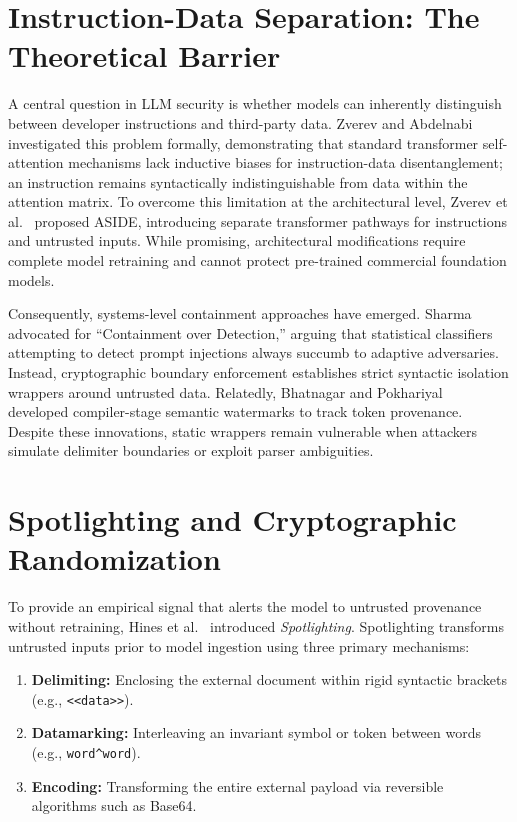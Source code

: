 \section{Instruction-Data Separation: The Theoretical Barrier}
\label{sec:rel_instruction_data_sep}

A central question in LLM security is whether models can inherently distinguish between developer instructions and third-party data. Zverev and Abdelnabi~\cite{zverev2025can} investigated this problem formally, demonstrating that standard transformer self-attention mechanisms lack inductive biases for instruction-data disentanglement; an instruction remains syntactically indistinguishable from data within the attention matrix. To overcome this limitation at the architectural level, Zverev et al.~\cite{zverev2026aside} proposed ASIDE, introducing separate transformer pathways for instructions and untrusted inputs. While promising, architectural modifications require complete model retraining and cannot protect pre-trained commercial foundation models.

Consequently, systems-level containment approaches have emerged. Sharma~\cite{sharma2026containment} advocated for ``Containment over Detection,'' arguing that statistical classifiers attempting to detect prompt injections always succumb to adaptive adversaries. Instead, cryptographic boundary enforcement establishes strict syntactic isolation wrappers around untrusted data. Relatedly, Bhatnagar and Pokhariyal~\cite{bhatnagar2025semantically} developed compiler-stage semantic watermarks to track token provenance. Despite these innovations, static wrappers remain vulnerable when attackers simulate delimiter boundaries or exploit parser ambiguities.

\section{Spotlighting and Cryptographic Randomization}
\label{sec:rel_spotlighting}

To provide an empirical signal that alerts the model to untrusted provenance without retraining, Hines et al.~\cite{hines2024spotlighting} introduced \emph{Spotlighting}. Spotlighting transforms untrusted inputs prior to model ingestion using three primary mechanisms:
\begin{enumerate}
    \item \textbf{Delimiting:} Enclosing the external document within rigid syntactic brackets (e.g., \texttt{<<data>>}).
    \item \textbf{Datamarking:} Interleaving an invariant symbol or token between words (e.g., \texttt{word\^{}word}).
    \item \textbf{Encoding:} Transforming the entire external payload via reversible algorithms such as Base64.
\end{enumerate}

